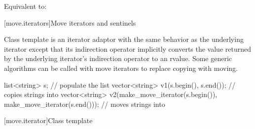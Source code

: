 \documentclass{wg21}
\begin{document}
\begin{itemdescr}
	\pnum
	\effects Equivalent to: 
\end{itemdescr}


[move.iterators]{Move iterators and sentinels}

\pnum
Class template  is an iterator adaptor
with the same behavior as the underlying iterator except that its
indirection operator implicitly converts the value returned by the
underlying iterator's indirection operator to an rvalue.
Some generic algorithms can be called with move iterators to replace
copying with moving.

\pnum
\begin{example}
	
	\begin{codeblock}
		list<string> s;
		// populate the list 
		vector<string> v1(s.begin(), s.end());          // copies strings into 
		vector<string> v2(make_move_iterator(s.begin()),
		make_move_iterator(s.end())); // moves strings into 
	\end{codeblock}
	
\end{example}

[move.iterator]{Class template }
\end{document}

